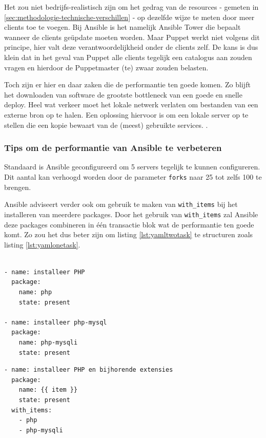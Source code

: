 Het zou niet bedrijfs-realistisch zijn om het gedrag van de resources  - gemeten in \ref{sec:methodologie-technische-verschillen} - op dezelfde wijze te meten door meer clients toe te voegen. Bij Ansible is het namelijk Ansible Tower die bepaalt wanneer de clients ge\"update moeten worden. Maar Puppet werkt niet volgens dit principe, hier valt deze verantwoordelijkheid onder de clients zelf. De kans is dus klein dat in het geval van Puppet alle clients tegelijk een catalogus aan zouden vragen en hierdoor de Puppetmaster (te) zwaar zouden belasten.

 Toch zijn er hier en daar zaken die de performantie ten goede komen. Zo blijft het downloaden van software de grootste bottleneck van een goede en snelle deploy. Heel wat verkeer moet het lokale netwerk verlaten om bestanden van een externe bron op te halen. Een oplossing hiervoor is om een lokale server op te stellen die een kopie bewaart van de (meest) gebruikte services. \autocite{AnsibleTuning}.
 
 \subsubsection{Tips om de performantie van Ansible te verbeteren}
 Standaard is Ansible geconfigureerd om 5 servers tegelijk te kunnen configureren. Dit aantal kan verhoogd worden door de parameter \texttt{\gls{fork}s} naar 25 tot zelfs 100 te brengen. 
 
Ansible adviseert verder ook om gebruik te maken van \texttt{with\_items} bij het installeren van meerdere packages. Door het gebruik van \texttt{with\_items} zal Ansible deze packages combineren in \'e\'en transactie blok wat de performantie ten goede komt. Zo zou het dus beter zijn om listing \ref{lst:yamltwotask} te structuren zoals listing \ref{lst:yamlonetask}. 


\begin{lstlisting}[frame=single]

- name: installeer PHP
  package:
    name: php
    state: present

- name: installeer php-mysql
  package:
    name: php-mysqli
    state: present
\end{lstlisting}

\begin{lstlisting}[frame=single]
- name: installeer PHP en bijhorende extensies
  package:
    name: {{ item }}
    state: present
  with_items:
    - php
    - php-mysqli
\end{lstlisting}

